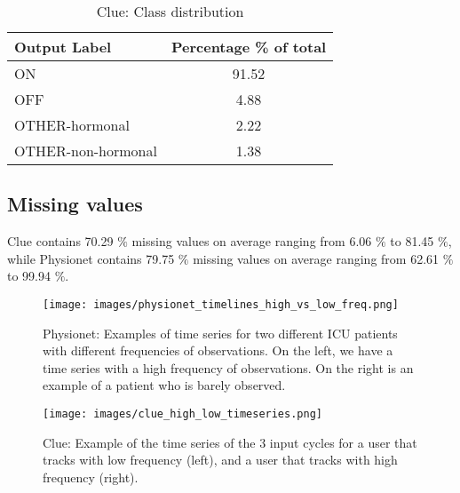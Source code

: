 \documentclass{article}
\begin{document}
\vspace{1cm}

\begin{table}[h]
\caption{\label{tab:clue_class_imbalance} Clue: Class distribution}
\vskip 0.15in
\begin{center}
\begin{sc}
\begin{tabular}{lc}
\toprule
Output Label & Percentage \% of total \\
\midrule
ON &  91.52 \\
OFF &  4.88 \\
OTHER-hormonal & 2.22 \\
OTHER-non-hormonal & 1.38 \\
\bottomrule
\end{tabular}
\end{sc}
\end{center}
\vskip -0.3in
\end{table} 

\newpage
\subsection{\large Missing values}
Clue contains 70.29 $\%$ missing values on average ranging from 6.06 $\%$ to 81.45 $\%$, while Physionet contains 79.75 $\%$ missing values on average ranging from 62.61 $\%$ to 99.94 $\%$. 

\begin{figure}[h]
\vskip 0.2in
\begin{center}
\centerline{\texttt{[image: images/physionet\_timelines\_high\_vs\_low\_freq.png]}}
\caption{Physionet: Examples of time series for two different ICU patients with different frequencies of observations. On the left, we have a time series with a high frequency of observations. On the right is an example of a patient who is barely observed.} 
\label{physio_high_low_missing}
\end{center}
\end{figure}

\begin{figure}[h]
\vskip 0.2in
\begin{center}
\centerline{\texttt{[image: images/clue\_high\_low\_timeseries.png]}}
\caption{Clue: Example of the time series of the 3 input cycles for a user that tracks with low frequency (left), and a user that tracks with high frequency (right).} 
\label{clue_high_low_missing}
\end{center}
\end{figure}
\end{document}
